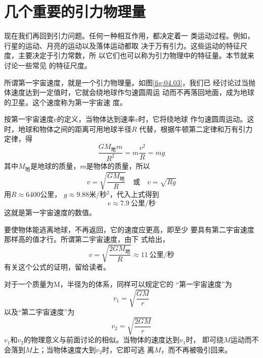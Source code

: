 \section{几个重要的引力物理量}\label{sec:04.05}

现在我们再回到引力问题。任何一种相互作用，都决定着一
类运动过程。例如，行星的运动、月亮的运动以及落体运动都取
决于万有引力。这些运动的特征尺度，主要决定于引力常数，所
以它们也可以称为引力物理中的特征量。本节就来讨论一些常见
的特征尺度。

所谓第一宇宙速度，就是一个引力物理量。如图\ref{fig:04.03}，我们已
经讨论过当抛体速度达到一定值时，它就会绕地球作匀速圆周运
动而不再落回地面，成为地球的卫星。这个速度称为第一宇宙速
度。

按第一宇宙速度$ v $的定义，当物体达到速率$ v $时，它将绕地球
作匀速圆周运动。这时，地球和物体之间的距离可用地球半径$ R $
代替，根据牛顿第二定律和万有引力定律，得
\begin{equation*}
	\frac { G M _ \text{地} m } { R ^ { 2 } } = m \frac { v ^ { 2 } } { R } = m g  
\end{equation*}
其中$ M _ \text{地} $是地球的质量，$ m $是物体的质量，所以
\begin{equation}\label{eqn:04.05.01}
	v = \sqrt {  \frac { G M _ { \text{地} } } { R }}  
\quad \text{或} \quad v = \sqrt { R g } 
\end{equation}
用$ R\approx 6400 $公里， $ g \approx 9.88 $米/秒$ ^2 $，代入上式得到
\begin{equation*}
	v \approx 7.9 ~\text{公里/秒}
\end{equation*}
这就是第一宇宙速度的数值。

要使物体能逃离地球，不再返回，它的速度应更高，即至少
要具有第二宇宙速度那样高的值才行。所谓第二宇宙速度，由下
式给出，
\begin{equation*}
	v = \sqrt{\frac { 2 G M _ { \text{地} } } { R }} \approx 11 ~\text{公里/秒}
\end{equation*}
有关这个公式的证明，留给读者。

对于一个质量为M，半径为的体系，同样可以规定它的
“第一宇宙速度”为
\begin{equation}\label{eqn:04.05.02}
	v _ { 1 } = \sqrt {\frac { G M } { r }}  
\end{equation}
以及“第二宇宙速度”为
\begin{equation}\label{eqn:04.05.03}
	v _ { 2 } = \sqrt {\frac { 2 G M } { r }}  
\end{equation}
$ v_1 $和$  v _ 2 $的物理意义与前面讨论的相似。当物体的速度达到$ v_1 $时，
即可绕$ M $运动而不会落到$ M $上；当物体速度大到$ v_2 $时，它即可逃
离$ M $，而不再被吸引回来。


